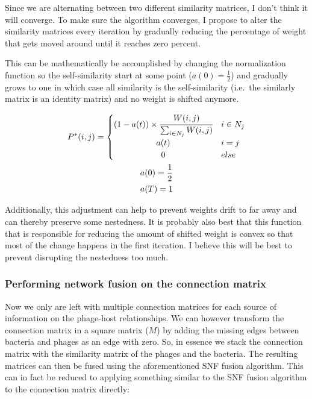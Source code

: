 \documentclass{article}
\begin{document}
Since we are alternating between two different similarity matrices, I don't think it will
converge. To make sure the algorithm converges, I propose to alter the
similarity matrices every iteration by gradually reducing the percentage of weight
that gets moved around until it reaches zero percent.

This can be mathematically be accomplished by changing the normalization
function so the self-similarity start at some point ($a(0) = \frac{1}{2}$) and gradually 
grows to one in which case all similarity is the self-similarity 
(i.e.\ the similarly matrix is an identity matrix)
and no weight is shifted anymore.

\begin{equation}
    \begin{gathered}
    P^*(i, j) = 
    \begin{cases}
        (1 - a(t)) \times \cfrac{W(i, j)}{\sum_{i \in N_j}W(i, j)} & i \in N_j \\
        \hfil a(t) & i = j \\
        \hfil 0 & else
    \end{cases} \\
    a(0) = \frac{1}{2} \\
    a(T) = 1
    \end{gathered}
\end{equation}

Additionally, this adjustment can help to prevent weights drift to far away and
can thereby preserve some nestedness. It is probably also best
that this function that is responsible for reducing the amount of shifted weight
is convex so that most of the change happens in the 
first iteration. I believe this will be best to prevent disrupting the 
nestedness too much.

\subsubsection{Performing network fusion on the connection matrix}

Now we only are left with multiple connection matrices for each source of 
information on the phage-host relationships. We can however transform the
connection matrix in a square matrix ($M$) by adding the missing edges between
bacteria and phages as an edge with zero. So, in essence we stack
the connection matrix with the similarity matrix of the phages and the bacteria.
The resulting matrices can then
be fused using the aforementioned SNF fusion algorithm. This can in fact
be reduced to applying something similar to the SNF fusion algorithm to the connection matrix 
directly:
\end{document}
